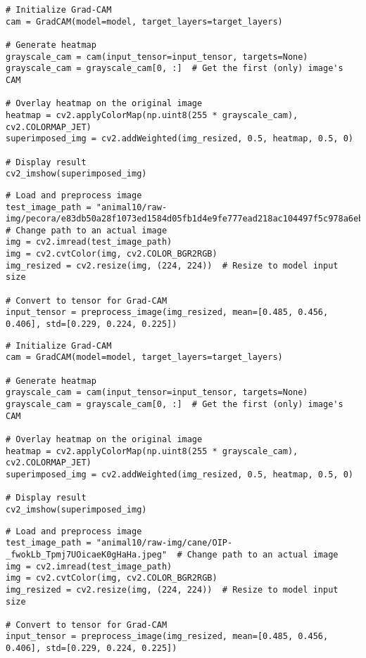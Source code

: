 \begin{verbatim}
# Initialize Grad-CAM
cam = GradCAM(model=model, target_layers=target_layers)

# Generate heatmap
grayscale_cam = cam(input_tensor=input_tensor, targets=None)
grayscale_cam = grayscale_cam[0, :]  # Get the first (only) image's CAM

# Overlay heatmap on the original image
heatmap = cv2.applyColorMap(np.uint8(255 * grayscale_cam), cv2.COLORMAP_JET)
superimposed_img = cv2.addWeighted(img_resized, 0.5, heatmap, 0.5, 0)

# Display result
cv2_imshow(superimposed_img)
\end{verbatim}

\begin{verbatim}
# Load and preprocess image
test_image_path = "animal10/raw-img/pecora/e83db50a28f1073ed1584d05fb1d4e9fe777ead218ac104497f5c978a6ebb3bf_640.jpg"  # Change path to an actual image
img = cv2.imread(test_image_path)
img = cv2.cvtColor(img, cv2.COLOR_BGR2RGB)
img_resized = cv2.resize(img, (224, 224))  # Resize to model input size

# Convert to tensor for Grad-CAM
input_tensor = preprocess_image(img_resized, mean=[0.485, 0.456, 0.406], std=[0.229, 0.224, 0.225])
\end{verbatim}

\begin{verbatim}
# Initialize Grad-CAM
cam = GradCAM(model=model, target_layers=target_layers)

# Generate heatmap
grayscale_cam = cam(input_tensor=input_tensor, targets=None)
grayscale_cam = grayscale_cam[0, :]  # Get the first (only) image's CAM

# Overlay heatmap on the original image
heatmap = cv2.applyColorMap(np.uint8(255 * grayscale_cam), cv2.COLORMAP_JET)
superimposed_img = cv2.addWeighted(img_resized, 0.5, heatmap, 0.5, 0)

# Display result
cv2_imshow(superimposed_img)
\end{verbatim}

\begin{verbatim}
# Load and preprocess image
test_image_path = "animal10/raw-img/cane/OIP-_fwokLb_Tpmj7UOicaeK0gHaHa.jpeg"  # Change path to an actual image
img = cv2.imread(test_image_path)
img = cv2.cvtColor(img, cv2.COLOR_BGR2RGB)
img_resized = cv2.resize(img, (224, 224))  # Resize to model input size

# Convert to tensor for Grad-CAM
input_tensor = preprocess_image(img_resized, mean=[0.485, 0.456, 0.406], std=[0.229, 0.224, 0.225])
\end{verbatim}

